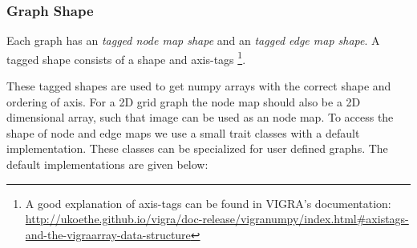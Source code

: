\subsubsection{Graph Shape}


Each graph has an \emph{tagged node map shape} 
and an \emph{tagged edge map shape}. 
A tagged shape consists of a shape and axis-tags
\footnote{
    A good explanation of axis-tags can be found in VIGRA's documentation:
    \url{http://ukoethe.github.io/vigra/doc-release/vigranumpy/index.html\#axistags-and-the-vigraarray-data-structure}
}.


These tagged shapes are used to get numpy arrays with 
the correct shape and ordering of axis.
For a 2D grid graph the node map should also be a 2D dimensional array,
such that image can be used as an node map.
To access the shape of node and edge maps 
we use a small trait classes with a default implementation.
These classes can be specialized for user defined graphs.
The default implementations are given below:


